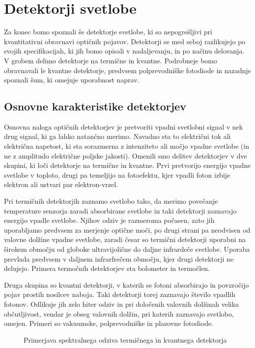 
\chapter{Detektorji svetlobe}

Za konec bomo spoznali še detektorje svetlobe, ki so nepogrešljivi
pri kvantitativni obravnavi optičnih pojavov. Detektorji se med seboj razlikujejo
po svojih specifikacijah, ki jih bomo opisali v nadaljevanju, in po načinu delovanja. 
V grobem delimo detektorje na termične in kvantne. Podrobneje bomo obravnavali le kvantne detektorje, 
predvsem polprevodniške fotodiode in nazadnje spoznali šum, ki omejuje uporabnost naprav.

\section{Osnovne karakteristike detektorjev}

Osnovna naloga optičnih detektorjev je pretvoriti vpadni svetlobni signal 
v nek drug signal, ki ga lahko natančno merimo. Navadno sta to električni tok 
ali električna napetost, ki sta sorazmerna z intenziteto ali močjo vpadne svetlobe 
(in ne z amplitudo električne poljske jakosti). Omenili smo delitev detektorjev v dve skupini, 
ki loči detektorje na termične in kvantne. Prvi pretvorijo energijo vpadne svetlobe 
v toploto, drugi pa temeljijo na fotoefektu, kjer vpadli foton izbije elektron ali 
ustvari par elektron-vrzel.

Pri termičnih detektorjih zaznamo svetlobo tako,
da merimo povečanje temperature senzorja zaradi absorbirane svetlobe in taki detektorji
zaznavajo energijo vpadle svetlobe. Njihov odziv je razmeroma počasen, zato jih uporabljamo
predvsem za merjenje optične moči, po drugi strani pa neodvisen
od valovne dolžine vpadne svetlobe, zaradi česar so termični detektorji uporabni na 
širokem območju od globoke ultravijolične do daljne infrardeče svetlobe. Uporaba
prevlada predvsem v daljnem infrarfrečem območju, kjer drugi detektorji ne delujejo.
Primera termočnih detektorjev sta bolometer in termočlen.

Druga skupina so kvantni detektorji, v katerih se
fotoni absorbirajo in povzročijo pojav prostih nosilcev naboja. Taki detektorji
torej zaznavajo število vpadlih fotonov. Odlikuje jih zelo hiter odziv in pri določenih 
valovnih dolžinah velika občutljivost, vendar je obseg valovnih dolžin, pri katerih
zaznavajo svetlobo, omejen. Primeri so vakuumske, polprevodniške in plazovne fotodiode.
\begin{figure}[h]
\centering
\def\svgwidth{70truemm} 

\caption{Primerjava spektralnega odziva termičnega in kvantnega detektorja}
\label{fig:shemaTermKv}
\end{figure}

